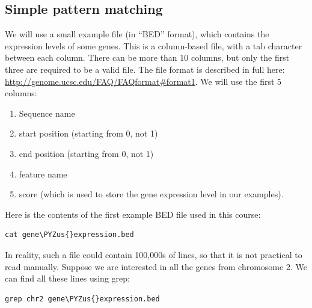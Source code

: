 \documentclass[11pt]{article}
\makeatletter
\providecommand{\tightlist}{%
      \setlength{\itemsep}{0pt}\setlength{\parskip}{0pt}}
\def\PYZus{\char`\_}
\newcommand{\boxspacing}{\kern\kvtcb@left@rule\kern\kvtcb@boxsep}
\newcommand{\prompt}[4]{
       \ttfamily\llap{{\color{#2}\LARGE\faKeyboardO\hspace{3pt}#4}}\vspace{-\baselineskip}
    }
\makeatother
\begin{document}
    \hypertarget{simple-pattern-matching}{%
\subsection{Simple pattern matching}\label{simple-pattern-matching}}

We will use a small example file (in ``BED'' format), which contains the
expression levels of some genes. This is a column-based file, with a tab
character between each column. There can be more than 10 columns, but
only the first three are required to be a valid file. The file format is
described in full here:
\url{http://genome.ucsc.edu/FAQ/FAQformat\#format1}. We will use the
first 5 columns:

\begin{enumerate}
\def\labelenumi{\arabic{enumi}.}
\tightlist
\item
  Sequence name
\item
  start position (starting from 0, not 1)
\item
  end position (starting from 0, not 1)
\item
  feature name
\item
  score (which is used to store the gene expression level in our
  examples).
\end{enumerate}

Here is the contents of the first example BED file used in this course:

    \begin{tcolorbox}[breakable, size=fbox, boxrule=1pt, pad at break*=1mm,colback=cellbackground, colframe=cellborder]
\prompt{In}{incolor}{ }{\boxspacing}
\begin{Verbatim}[commandchars=\\\{\}]
cat gene\PYZus{}expression.bed
\end{Verbatim}
\end{tcolorbox}

    In reality, such a file could contain 100,000s of lines, so that it is
not practical to read manually. Suppose we are interested in all the
genes from chromosome 2. We can find all these lines using grep:

    \begin{tcolorbox}[breakable, size=fbox, boxrule=1pt, pad at break*=1mm,colback=cellbackground, colframe=cellborder]
\prompt{In}{incolor}{ }{\boxspacing}
\begin{Verbatim}[commandchars=\\\{\}]
grep chr2 gene\PYZus{}expression.bed
\end{Verbatim}
\end{tcolorbox}
\end{document}

